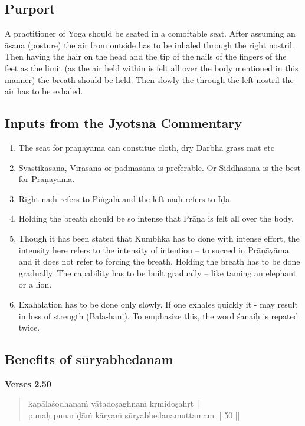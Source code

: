 \subsection*{Purport}

A practitioner of Yoga should be seated in a comoftable seat. After assuming an āsana (posture) the air from outside has to be inhaled through the right nostril.  Then having the hair on the head and the tip of the nails of the fingers of the feet as the limit (as the air held within is felt all over the body mentioned in this manner) the breath should be held. Then slowly the through the left nostril the air has to be exhaled. 

\subsection*{Inputs from the Jyotsnā Commentary}

\begin{enumerate}
\itemsep=0pt
\item The seat for prāṇāyāma can constitue cloth, dry Darbha grass mat etc
\item Svastikāsana, Virāsana or padmāsana is preferable. Or Siddhāsana is the best for Prāṇāyāma. 
\item Right nāḍī refers to Piṅgala and the left nāḍī refers to Iḍā. 
\item Holding the breath should be so intense that Prāṇa is felt all over the body. 
\item Though it has been stated that Kumbhka has to done with intense effort, the intensity here refers to the intensity of intention – to succed in Prāṇāyāma and it does not refer to forcing the breath. Holding the breath has to be done gradually. The capability has to be built gradually – like taming an elephant or a lion. 
\item Exahalation has to be done only slowly. If one exhales quickly it - may result in loss of strength (Bala-hani). To emphasize this, the word śanaiḥ is repated twice.       
\end{enumerate}
\newpage
	
\subsection*{Benefits of sūryabhedanam}


\noindent \textbf{Verses 2.50}

\begin{verse}
kapālaśodhanaṁ vātadoṣaghnaṁ kṛmidoṣahṛt |\\
punaḥ punariḍāṁ kāryaṁ sūryabhedanamuttamam || 50 ||
\end{verse}


